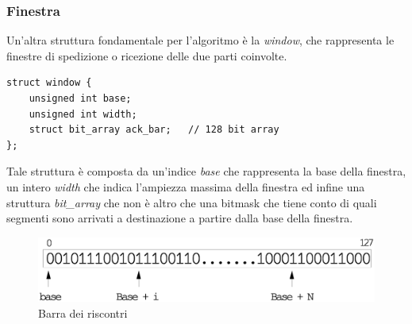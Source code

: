 \subsubsection{Finestra}
Un'altra struttura fondamentale per l'algoritmo è la \emph{window}, che 
rappresenta le finestre di spedizione o ricezione delle due parti 
coinvolte.
%
\begin{lstlisting}[title=window.h]
struct window {
	unsigned int base;
	unsigned int width;
	struct bit_array ack_bar;	// 128 bit array
};
\end{lstlisting}
%
Tale struttura è composta da un'indice \emph{base} che rappresenta la base
della finestra, un intero \emph{width} che indica l'ampiezza massima della
finestra ed infine una struttura \emph{bit\_array} che non è altro che una
bitmask che tiene conto di quali segmenti sono arrivati a destinazione a 
partire dalla base della finestra.
%
\begin{figure}[!h]
\includegraphics[scale=0.35]{images/ack_bar}
\caption{Barra dei riscontri}
\end{figure}
%
